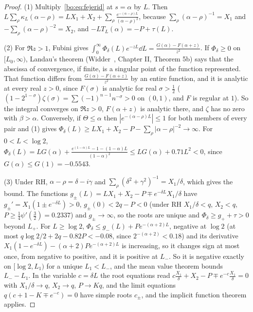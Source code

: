 \begin{proof}
(1) Multiply~\eqref{bo:eq:fejerid} at $s=\alpha$ by $L$. Then $L\sum_\rho\kappa_L(\alpha-\rho)=LX_1+X_2+\sum_\rho\frac{e^{-(\alpha-\rho)L}}{(\alpha-\rho)^2}$, because $\sum_\rho(\alpha-\rho)^{-1}=X_1$ and $-\sum_\rho(\alpha-\rho)^{-2}=X_2$, and $-LT_L(\alpha)=-P+\tau(L)$.

(2) For $\Re z>1$, Fubini gives $\int_0^\infty\Phi_\delta(L)e^{-zL}\dd L=\frac{G(\alpha)-F(\alpha+z)}{z^2}$. If $\Phi_\delta\ge0$ on $[L_0,\infty)$, Landau's theorem (Widder~\cite{Widder41}, Chapter II, Theorem 5b) says that the abscissa of convergence, if finite, is a singular point of the function represented. That function differs from $\frac{G(\alpha)-F(\alpha+z)}{z^2}$ by an entire function, and it is analytic at every real $z>0$, since $F(\sigma)$ is analytic for real $\sigma>\frac12$ ($(1-2^{1-\sigma})\zeta(\sigma)=\sum(-1)^{n-1}n^{-\sigma}>0$ on $(0,1)$, and $F$ is regular at $1$). So the integral converges on $\Re z>0$, $F(\alpha+z)$ is analytic there, and $\zeta$ has no zero with $\beta>\alpha$. Conversely, if $\Theta\le\alpha$ then $|e^{-(\alpha-\rho)L}|\le1$ for both members of every pair and (1) gives $\Phi_\delta(L)\ge LX_1+X_2-P-\sum_\rho|\alpha-\rho|^{-2}\to\infty$. For $0<L<\log2$, $\Phi_\delta(L)=LG(\alpha)+\frac{e^{(1-\alpha)L}-1-(1-\alpha)L}{(1-\alpha)^2}\le LG(\alpha)+0.71L^2<0$, since $G(\alpha)\le G(1)=-0.5543$.

(3) Under RH, $\alpha-\rho=\delta-i\gamma$ and $\sum_\rho(\delta^2+\gamma^2)^{-1}=X_1/\delta$, which gives the bound. The functions $g_\pm(L)=LX_1+X_2-P\mp e^{-\delta L}X_1/\delta$ have $g_\pm'=X_1(1\pm e^{-\delta L})>0$, $g_\pm(0)<2q-P<0$ (under RH $X_1/\delta<q$, $X_2<q$, $P\ge\frac14\psi'(\frac32)=0.2337$) and $g_\pm\to\infty$, so the roots are unique and $\Phi_\delta\ge g_++\tau>0$ beyond $L_+$. For $L\ge\log2$, $\Phi_\delta\le g_-(L)+Pe^{-(\alpha+2)L}$, negative at $\log2$ (at most $q\log2/2+2q-0.82P<-0.08$, since $2^{-(\alpha+2)}<0.18$) and its derivative $X_1(1-e^{-\delta L})-(\alpha+2)Pe^{-(\alpha+2)L}$ is increasing, so it changes sign at most once, from negative to positive, and it is positive at $L_-$. So it is negative exactly on $[\log2,L_1)$ for a unique $L_1<L_-$, and the mean value theorem bounds $L_--L_1$. In the variable $c=\delta L$ the root equations read $c\frac{X_1}\delta+X_2-P\mp e^{-c}\frac{X_1}\delta=0$ with $X_1/\delta\to q$, $X_2\to q$, $P\to Kq$, and the limit equations $q(c+1-K\mp e^{-c})=0$ have simple roots $c_\pm$, and the implicit function theorem applies.


\end{proof}
